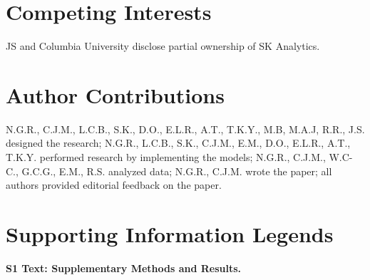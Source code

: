 \documentclass{article}\usepackage[]{graphicx}\usepackage[]{color}
\begin{document}
\section*{Competing Interests}
JS and Columbia University disclose partial ownership of SK Analytics.

\section*{Author Contributions}
N.G.R., C.J.M., L.C.B., S.K., D.O., E.L.R., A.T., T.K.Y., M.B, M.A.J, R.R., J.S. designed the research; N.G.R., L.C.B., S.K., C.J.M., E.M., D.O., E.L.R., A.T., T.K.Y. performed research by implementing the models; N.G.R., C.J.M., W.C-C., G.C.G., E.M., R.S. analyzed data; N.G.R., C.J.M. wrote the paper; all authors provided editorial feedback on the paper.




\section*{Supporting Information Legends}

{\bf S1 Text: Supplementary Methods and Results.}
\end{document}
